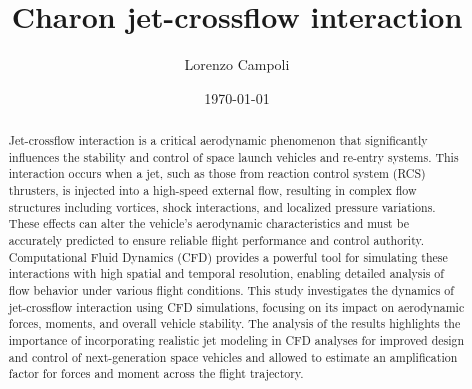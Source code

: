 \documentclass[12pt]{article}
\title{Charon jet-crossflow interaction}
\author{Lorenzo Campoli}
\date{\today}
\begin{document}
%
\setmainfont{Arial}
%
\maketitle
%
\renewcommand{\arraystretch}{1.5} %
\setlength{\tabcolsep}{8pt}       %
%
\begin{center}
\end{center}

\begin{abstract}
\noindent Jet-crossflow interaction is a critical aerodynamic phenomenon that significantly influences the stability and control of space launch vehicles and re-entry systems. This interaction occurs when a jet, such as those from reaction control system (RCS) thrusters, is injected into a high-speed external flow, resulting in complex flow structures including vortices, shock interactions, and localized pressure variations. These effects can alter the vehicle's aerodynamic characteristics and must be accurately predicted to ensure reliable flight performance and control authority. Computational Fluid Dynamics (CFD) provides a powerful tool for simulating these interactions with high spatial and temporal resolution, enabling detailed analysis of flow behavior under various flight conditions. This study investigates the dynamics of jet-crossflow interaction using CFD simulations, focusing on its impact on aerodynamic forces, moments, and overall vehicle stability. The analysis of the results highlights the importance of incorporating realistic jet modeling in CFD analyses for improved design and control of next-generation space vehicles and allowed to estimate an amplification factor for forces and moment across the flight trajectory.
\end{abstract}
\end{document}
